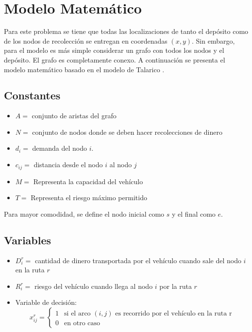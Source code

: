 \documentclass{article}
\begin{document}
\newpage
\section{Modelo Matem\'atico}
Para este problema se tiene que todas las localizaciones de tanto el depósito como de los nodos de recolección se entregan en coordenadas $(x,y)$. Sin embargo, para el modelo es más simple considerar un grafo con todos los nodos y el depósito. El grafo es completamente conexo. 
A continuación se presenta el modelo matemático basado en el modelo de Talarico \cite{talarico2015metaheuristics}.
\subsection{Constantes}
\begin{itemize}
    \item $A =$ conjunto de aristas del grafo
    \item $N =$ conjunto de nodos donde se deben hacer recolecciones de dinero
    \item $d_i =$ demanda del nodo $i$. 
    \item $c_{ij} =$ distancia desde el nodo $i$ al nodo $j$
    \item $M =$ Representa la capacidad del vehículo
    \item $T =$ Representa el riesgo máximo permitido
\end{itemize}
Para mayor comodidad, se define el nodo inicial como $s$ y el final como $e$.

\subsection{Variables}
\begin{itemize}
    \item $D^r_i=$ cantidad de dinero transportada por el vehículo cuando sale del nodo $i$ en la ruta $r$
    \item $R_i^r=$ riesgo del vehículo cuando llega al nodo $i$ por la ruta $r$
    \item Variable de decisión:
    \begin{equation*}
        x^r_{ij}= 
        \begin{cases}
            1 & \text{si el arco $(i,j)$ es recorrido por el vehículo en la ruta r}\\
            0 & \text{en otro caso}
        \end{cases}
    \end{equation*}
\end{itemize}
\end{document}
